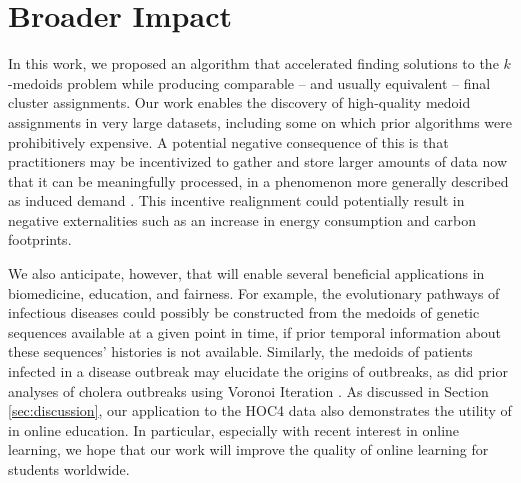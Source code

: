 
\section*{Broader Impact}
\label{sec:impact}

In this work, we proposed an algorithm that accelerated finding solutions to the $k$-medoids problem while producing comparable -- and usually equivalent -- final cluster assignments. Our work enables the discovery of high-quality medoid assignments in very large datasets, including some on which prior algorithms were prohibitively expensive. A potential negative consequence of this is that practitioners may be incentivized to gather and store larger amounts of data now that it can be meaningfully processed, in a phenomenon more generally described as induced demand \cite{induceddemand}. This incentive realignment could potentially result in negative externalities such as an increase in energy consumption and carbon footprints.

We also anticipate, however, that \algname will enable several beneficial applications in biomedicine, education, and fairness. For example, the evolutionary pathways of infectious diseases could possibly be constructed from the medoids of genetic sequences available at a given point in time, if prior temporal information about these sequences' histories is not available. Similarly, the medoids of patients infected in a disease outbreak may elucidate the origins of outbreaks, as did prior analyses of cholera outbreaks using Voronoi Iteration \cite{cholera}. As discussed in Section \ref{sec:discussion}, our application to the HOC4 data also demonstrates the utility of \algname in online education. In particular, especially with recent interest in online learning, we hope that our work will improve the quality of online learning for students worldwide.
